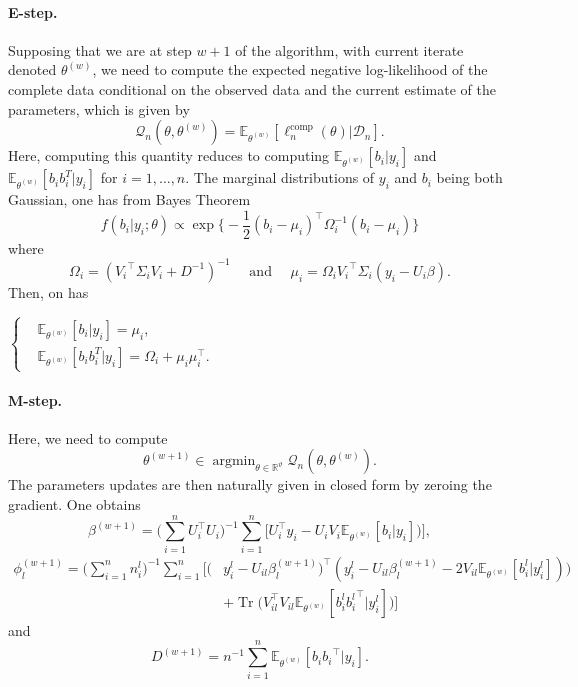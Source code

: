 \documentclass[11pt]{article}
\DeclareMathOperator{\argmin}{argmin}
\DeclareMathOperator{\Tr}{Tr}
\newcommand{\cD}{\mathcal D}
\newcommand{\cQ}{\mathcal Q}
\newcommand{\R}{\mathds R}
\newcommand{\E}{\mathds E}
\begin{document}
\paragraph*{E-step.}
Supposing that we are at step $w + 1$ of the algorithm, with current iterate denoted $\theta^{(w)}$, we need to compute the expected negative log-likelihood of the complete data conditional on the observed data and the current estimate of the parameters, which is given by 
\[\cQ_n(\theta, \theta^{(w)}) = \E_{\theta^{(w)}}[\ell_n^\text{comp}(\theta) | \cD_n].\]
Here, computing this quantity reduces to computing $\E_{\theta^{(w)}}[b_i | y_i]$ and $\E_{\theta^{(w)}}[b_ib_i^T | y_i]$ for $i = 1,\ldots,n$.
The marginal distributions of $y_i$ and $b_i$ being both Gaussian, one has from Bayes Theorem
\[ f(b_i|y_i; \theta) \propto \exp \big\{ -\dfrac12 (b_i - \mu_i)^\top \Omega_i^{-1} (b_i - \mu_i) \big\}\]
where
\[\Omega_i = ({V_i}^\top \Sigma_iV_i + D^{-1})^{-1} \quad \text{ and } \quad \mu_i = \Omega_i{V_i}^\top \Sigma_i(y_i - U_i\beta).\]
Then, on has
\begin{center}
  $\left\{
    \begin{aligned}
      &\E_{\theta^{(w)}}[b_i | y_i] = \mu_i, \\
      &\E_{\theta^{(w)}}[b_ib_i^T | y_i] = \Omega_i + \mu_i\mu_i^\top.
    \end{aligned}
    \right.$
\end{center}

\paragraph*{M-step.}
Here, we need to compute \[\theta^{(w+1)} \in \argmin_{\theta \in \R^\vartheta} \cQ_n(\theta, \theta^{(w)}) .\]
The parameters updates are then naturally given in closed form by zeroing the gradient. One obtains
\[\beta^{(w+1)} = \Big(\sum_{i=1}^n U_{i}^\top U_{i}\Big)^{-1}  \sum_{i=1}^n \big[ U_{i}^\top  y_i - U_{i} V_{i} \E_{\theta^{(w)}}[ b_i | y_i]) \big],\]
\begin{align*}
\phi_l^{(w+1)} = \big(\sum_{i=1}^n n_i^l \big)^{-1}  \sum_{i=1}^n \Big[(&y_i^l - U_{il}\beta_l^{(w+1)})^\top (y_i^l - U_{il}\beta_l^{(w+1)} - 2V_{il}\E_{\theta^{(w)}}[b_i^l | y_i^l])) \\
&+\Tr\big(V_{il}^\top V_{il} \E_{\theta^{(w)}}[ b_i^l {b_i^l}^\top | y_i^l]\big) \Big]
\end{align*}
and \[D^{(w+1)} = n^{-1} \sum_{i=1}^n \E_{\theta^{(w)}}[ b_i {b_i}^\top | y_i].\]


{}
\end{document}
